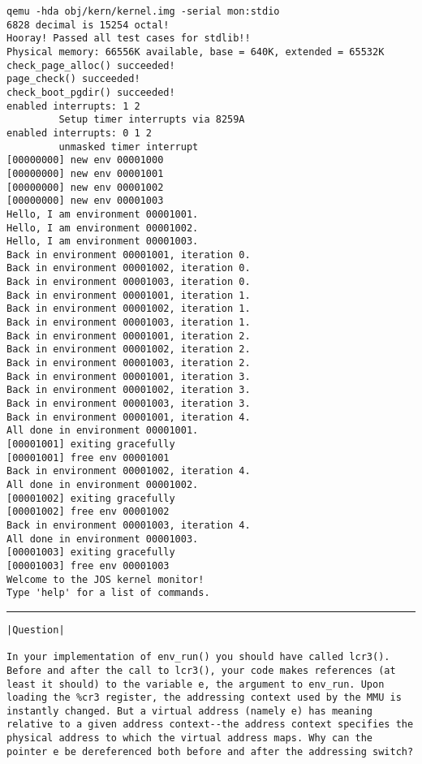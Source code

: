 \documentclass{article}
\begin{document}
\begin{CJK*}{UTF8}{gkai}
\begin{lstlisting}[style=console]
qemu -hda obj/kern/kernel.img -serial mon:stdio
6828 decimal is 15254 octal!
Hooray! Passed all test cases for stdlib!!
Physical memory: 66556K available, base = 640K, extended = 65532K
check_page_alloc() succeeded!
page_check() succeeded!
check_boot_pgdir() succeeded!
enabled interrupts: 1 2
	     Setup timer interrupts via 8259A
enabled interrupts: 0 1 2
	     unmasked timer interrupt
[00000000] new env 00001000
[00000000] new env 00001001
[00000000] new env 00001002
[00000000] new env 00001003
Hello, I am environment 00001001.
Hello, I am environment 00001002.
Hello, I am environment 00001003.
Back in environment 00001001, iteration 0.
Back in environment 00001002, iteration 0.
Back in environment 00001003, iteration 0.
Back in environment 00001001, iteration 1.
Back in environment 00001002, iteration 1.
Back in environment 00001003, iteration 1.
Back in environment 00001001, iteration 2.
Back in environment 00001002, iteration 2.
Back in environment 00001003, iteration 2.
Back in environment 00001001, iteration 3.
Back in environment 00001002, iteration 3.
Back in environment 00001003, iteration 3.
Back in environment 00001001, iteration 4.
All done in environment 00001001.
[00001001] exiting gracefully
[00001001] free env 00001001
Back in environment 00001002, iteration 4.
All done in environment 00001002.
[00001002] exiting gracefully
[00001002] free env 00001002
Back in environment 00001003, iteration 4.
All done in environment 00001003.
[00001003] exiting gracefully
[00001003] free env 00001003
Welcome to the JOS kernel monitor!
Type 'help' for a list of commands.
\end{lstlisting}

\vspace{2em}
\hrule
\vspace{2em}


\begin{lstlisting}[style=exercise]
|Question|

In your implementation of env_run() you should have called lcr3(). Before and after the call to lcr3(), your code makes references (at least it should) to the variable e, the argument to env_run. Upon loading the %cr3 register, the addressing context used by the MMU is instantly changed. But a virtual address (namely e) has meaning relative to a given address context--the address context specifies the physical address to which the virtual address maps. Why can the pointer e be dereferenced both before and after the addressing switch?
\end{lstlisting}


\end{CJK*}
\end{document}
